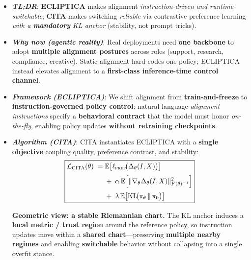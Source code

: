 \documentclass{article}
\begin{document}
\begin{defin}
\scriptsize
\vspace{-2mm}
\begin{itemize}[left=-4pt,itemsep=0pt,topsep=0pt,parsep=0pt]

\item[\faBolt] \textbf{\textit{TL;DR}}:
\textbf{ECLIPTICA} makes alignment \emph{instruction-driven and runtime-switchable};
\textbf{CITA} makes switching \emph{reliable} via contrastive preference learning \emph{with a \textbf{mandatory} KL anchor} (stability, not prompt tricks).

\item[\faGlobeAmericas] \textbf{\textit{Why now (agentic reality)}}:
Real deployments need \textbf{one backbone} to adopt \textbf{multiple alignment postures} across roles (support, research, compliance, creative).
Static alignment hard-codes one policy; ECLIPTICA instead elevates alignment to a \textbf{first-class inference-time control channel}.

\item[\faCompass] \textbf{\textit{Framework (ECLIPTICA)}}:
We shift alignment from \textbf{train-and-freeze} to \textbf{instruction-governed policy control}:
natural-language \emph{alignment instructions} specify a \textbf{behavioral contract} that the model must honor \emph{on-the-fly}, enabling policy updates \textbf{without retraining checkpoints}.

\item[\faCogs] \textbf{\textit{Algorithm (CITA)}}:
CITA instantiates ECLIPTICA with a \textbf{single objective} coupling quality, preference contrast, and stability:
\vspace{-1em}
\[
\boxed{
\begin{aligned}
\mathcal{L}_{\textsc{CITA}}(\theta)
\;=\;&
\mathbb{E}\!\left[\ell_{\textsc{pref}}\!\big(\Delta_\theta(I,X)\big)\right]
\\[0.25em]
&+\;
\alpha\,\mathbb{E}\!\left[\|\nabla_\theta \Delta_\theta(I,X)\|_{F(\theta)^{-1}}^{2}\right]
\\[0.25em]
&+\;
\lambda\,\mathbb{E}\!\left[\mathrm{KL}\!\big(\pi_\theta \,\|\, \pi_0\big)\right]
\end{aligned}
}
\]
\vspace{-1.5em}

\textbf{Geometric view: a stable Riemannian chart.} The KL anchor induces a \textbf{local metric / trust region} around the reference policy, so instruction updates move within a \textbf{shared chart}—preserving \textbf{multiple nearby regimes} and enabling \textbf{switchable} behavior without collapsing into a single overfit stance.



\end{itemize}
\end{defin}
\end{document}
